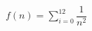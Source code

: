 \documentclass[preview]{standalone}
\begin{document}
\begin{align*}
f( n ) = \sum_{i=0}^{12}\dfrac{1}{ n ^2}
\end{align*}
\end{document}
